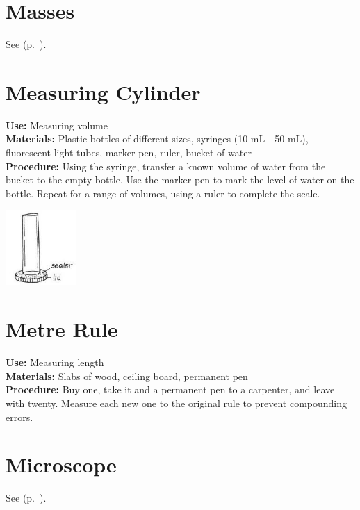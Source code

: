 \begin{multicols}{2}
\section{Masses} 
\label{sec:masses}
See  (p.~\pageref{sec:weights}).

\section{Measuring Cylinder} 
\label{sec:meascyl}
\vspace{-10pt}
\textbf{Use:} Measuring volume\\
\textbf{Materials:} Plastic bottles of different sizes, syringes (10 mL - 50 mL), fluorescent light tubes, marker pen, ruler, bucket of water\\
\textbf{Procedure:} Using the syringe, transfer a known volume of water from the bucket to the empty bottle. Use the marker pen to mark the level of water on the bottle. Repeat for a range of volumes, using a ruler to complete the scale. 
\begin{center}
\includegraphics[width=0.2\textwidth]{./img/vso/meas-cyl.jpg}
\end{center}

\columnbreak

\section{Metre Rule} 
\label{sec:meter-rule}
\vspace{-10pt}
\textbf{Use:} Measuring length\\
\textbf{Materials:} Slabs of wood, ceiling board, permanent pen\\
\textbf{Procedure:} Buy one, take it and a permanent pen to a carpenter, and leave with twenty. Measure each new one to the original rule to prevent compounding errors.

\section{Microscope} 
\label{sec:microscope}
See  (p.~\pageref{cha:microscopy}).


\end{multicols}
